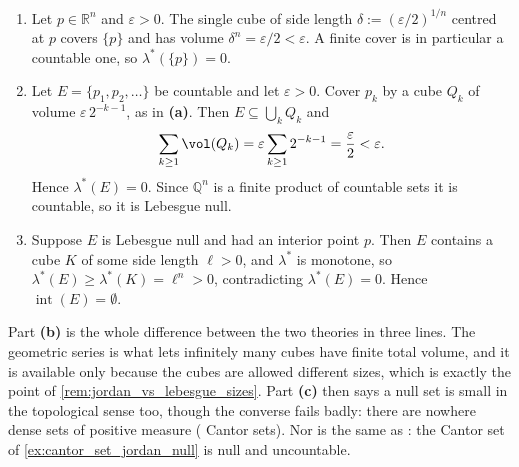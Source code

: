 \begin{exercisesolution}
\label{sol:ai_lebesgue_null_countable}
\begin{enumerate}[label=\textbf{(\alph*)}]
  \item Let $p \in \mathbb{R}^n$ and $\varepsilon > 0$. The single cube of side length
    $\delta := (\varepsilon/2)^{1/n}$ centred at $p$ covers $\{p\}$ and has volume
    $\delta^n = \varepsilon/2 < \varepsilon$. A finite cover is in particular a countable one, so
    $\lambda^*(\{p\}) = 0$.

  \item Let $E = \{p_1,p_2,\dots\}$ be countable and let $\varepsilon > 0$. Cover $p_k$ by a cube
    $Q_k$ of volume $\varepsilon\,2^{-k-1}$, as in \textbf{(a)}. Then $E \subseteq
    \bigcup_k Q_k$ and
    \[\sum_{k\ge1}\vol(Q_k) = \varepsilon\sum_{k\ge1}2^{-k-1} = \frac{\varepsilon}{2} < \varepsilon.\]
    Hence $\lambda^*(E) = 0$. Since $\mathbb{Q}^n$ is a finite product of countable sets it is
    countable, so it is Lebesgue null.

  \item Suppose $E$ is Lebesgue null and had an interior point $p$. Then $E$ contains a cube $K$ of
    some side length $\ell > 0$, and $\lambda^*$ is monotone, so
    $\lambda^*(E) \ge \lambda^*(K) = \ell^n > 0$, contradicting $\lambda^*(E) = 0$. Hence
    $\operatorname{int}(E) = \emptyset$.
\end{enumerate}
\begin{remark}
Part \textbf{(b)} is the whole difference between the two theories in three lines. The geometric
series is what lets infinitely many cubes have finite total volume, and it is available only
because the cubes are allowed different sizes, which is exactly the point of
\cref{rem:jordan_vs_lebesgue_sizes}. Part \textbf{(c)} then says a null set is small in the
topological sense too, though the converse fails badly: there are nowhere dense sets of positive
measure ( Cantor sets). Nor is  the same as : the Cantor set of
\cref{ex:cantor_set_jordan_null} is null and uncountable.
\end{remark}
\end{exercisesolution}

